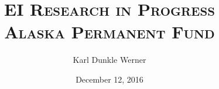 \documentclass[aspectratio=169]{beamer}
\title[Cars in Alaska]{\textsc{EI Research in Progress\\Alaska Permanent Fund}}
\author{Karl Dunkle Werner}
\institute{}
\date{December 12, 2016}
\begin{document}
\begin{frame}[plain]
	\maketitle

\end{frame}
\end{document}

